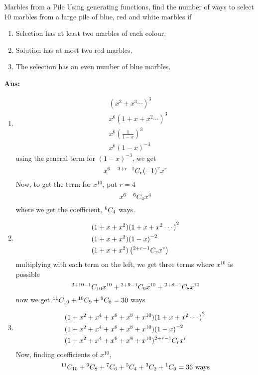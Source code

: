 \begin{exampletcb}{Marbles from a Pile}{}
    Using generating functions, find the number of ways to select 10 marbles from a large pile of blue, red and white marbles if
    \begin{enumerate}
        \item Selection has at least two marbles of each colour,
        \item Solution has at most two red marbles,
        \item The selection has an even number of blue marbles.
    \end{enumerate}

    \textbf{Ans:} \begin{enumerate}
        \item \begin{align*}
                   & {(x^2+x^3\cdots)}^3                \\
                   & x^6 {(1+x+x^2\cdots)}^3            \\
                   & x^6 {\left(\frac{1}{1-x}\right)}^3 \\
                   & x^6 {(1-x)}^{-3}
              \end{align*}
              using the general term for \mbox{${(1-x)}^{-3}$}, we get
              \[
                  x^6\quad {}^{3+r-1}C_{r} {(-1)}^r x^r
              \]
              Now, to get the term for \mbox{$x^{10}$}, put \mbox{$r=4$}
              \[
                  x^6\quad{}^{6}C_{4} x^4
              \]
              where we get the coefficient, \mbox{${}^{6}C_{4}$} ways.

        \item \begin{align*}
                   & (1+x+x^2){(1+x+x^2\cdots)}^2             \\
                   & (1+x+x^2){(1-x)}^{-2}                    \\
                   & (1+x+x^2)\left({}^{2+r-1}C_{r}x^r\right)
              \end{align*}
              multiplying with each term on the left, we get three terms where \mbox{$x^{10}$} is possible
              \[
                  {}^{2+10-1}C_{10}x^{10} + {}^{2+9-1}C_{9}x^{10} + {}^{2+8-1}C_{8}x^{10}
              \]
              now we get \mbox{${}^{11}C_{10} + {}^{10}C_{9}+ {}^{9}C_{8} = 30$} ways

        \item \begin{align*}
                   & (1+x^2+x^4+x^6+x^8+x^{10}){(1+x+x^2\cdots)}^2\, \\
                   & (1+x^2+x^4+x^6+x^8+x^{10}){(1-x)}^{-2}          \\
                   & (1+x^2+x^4+x^6+x^8+x^{10}){}^{2+r-1}C_{r}x^r\,  \\
              \end{align*}
              Now, finding coefficients of \mbox{$x^{10}$},
              \[
                  {}^{11}C_{10} + {}^{9}C_{8} + {}^{7}C_{6} +{}^{5}C_{4} + {}^{3}C_{2} + {}^{1}C_{0} = 36 \text{ ways}
              \]
    \end{enumerate}
\end{exampletcb}

